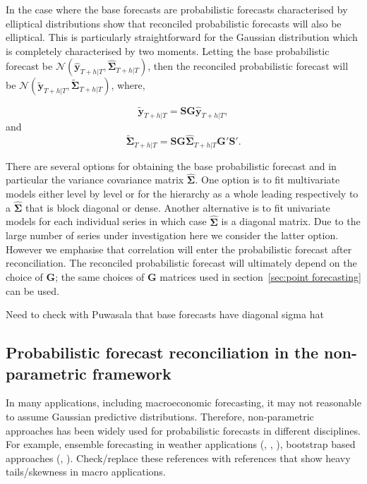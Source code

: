 \documentclass[graybox]{svmult}
\begin{document}
In the case where the base forecasts are probabilistic forecasts characterised by elliptical distributions \cite{Gamakumara2018} show that reconciled probabilistic forecasts will also be elliptical.  This is particularly straightforward for the Gaussian distribution which is completely characterised by two moments.  Letting the base probabilistic forecast be $\mathscr{N}(\bm{\hat{y}}_{T+h|T}, \hat{\bm{\Sigma}}_{T+h|T})$, then the reconciled probabilistic forecast will be $\mathscr{N}(\bm{\tilde{y}}_{T+h|T}, \tilde{\bm{\Sigma}}_{T+h|T})$, where,

\begin{equation}\label{eq:rec mean}
\bm{\tilde{y}}_{T+h|T} = \bm{SG}\bm{\hat{y}}_{T+h|T},
\end{equation}
and
\begin{equation}\label{eq:rec var}
\tilde{\bm{\Sigma}}_{T+h|T} = \bm{SG}\hat{\bm{\Sigma}}_{T+h|T}\bm{G'S'}.
\end{equation}

There are several options for obtaining the base probabilistic forecast and in particular the variance covariance matrix $\hat{\bm{\Sigma}}$.  One option is to fit multivariate models either level by level or for the hierarchy as a whole leading respectively to a $\hat{\bm \Sigma}$ that is block diagonal or dense.  Another alternative is to fit univariate models for each individual series in which case $\hat{\bm{\Sigma}}$ is a diagonal matrix. Due to the large number of series under investigation here we consider the latter option.  However we emphasise that correlation will enter the probabilistic forecast after reconciliation.  The reconciled probabilistic forecast will ultimately depend on the choice of $\bm{G}$; the same choices of $\bm{G}$ matrices used in section~\ref{sec:point forecasting} can be used.

{\color{red} Need to check with Puwasala that base forecasts have diagonal sigma hat}

\subsection{Probabilistic forecast reconciliation in the non-parametric framework}\label{sec:probrecnp}

In many applications, including macroeconomic forecasting, it may not reasonable to assume Gaussian predictive distributions. Therefore, non-parametric approaches has been widely used for probabilistic forecasts in different disciplines. For example, ensemble forecasting in weather applications (\cite{Gneiting2005}, \cite{Gneiting2014}, \cite{Gneiting2008}), bootstrap based approaches (\cite{Manzan2008}, \cite{Vilar2013}). {\color{red} Check/replace these references with references that show heavy tails/skewness in macro applications.}
\end{document}
